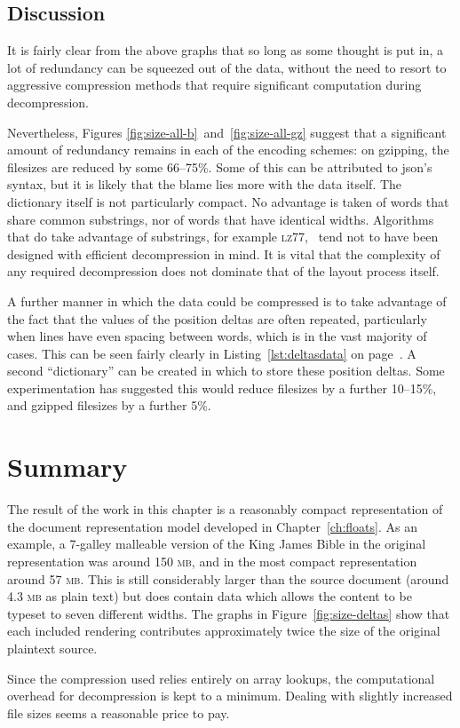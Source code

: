 \subsection{Discussion}

It is fairly clear from the above graphs that so long as some thought is put in, a lot of redundancy can be squeezed out of the data, without the need to resort to aggressive compression methods that require significant computation during decompression.

Nevertheless, Figures \ref{fig:size-all-b}~and~\ref{fig:size-all-gz} suggest that a significant amount of redundancy remains in each of the encoding schemes: on gzipping, the filesizes are reduced by some 66--75\%. Some of this can be attributed to \gls{json}'s syntax, but it is likely that the blame lies more with the data itself. The dictionary itself is not particularly compact. No advantage is taken of words that share common substrings, nor of words that have identical widths.
Algorithms that do take advantage of substrings, for example \textsc{lz77},~\cite{Ziv1977} tend not to have been designed with efficient decompression in mind. It is vital that the complexity of any required decompression does not dominate that of the layout process itself.

A further manner in which the data could be compressed is to take advantage of the fact that the values of the position deltas are often repeated, particularly when lines have even spacing between words, which is in the vast majority of cases. This can be seen fairly clearly in Listing~\ref{lst:deltasdata} on page~\pageref{lst:deltasdata}. A second ``dictionary'' can be created in which to store these position deltas. Some experimentation has suggested this would reduce filesizes by a further 10--15\%, and gzipped filesizes by a further 5\%.

\section{Summary}

The result of the work in this chapter is a reasonably compact representation of the document representation model developed in Chapter~\ref{ch:floats}. As an example, a 7-galley malleable version of the King James Bible in the original representation was around 150 \textsc{mb}, and in the most compact representation around 57 \textsc{mb}. This is still considerably larger than the source document (around 4.3 \textsc{mb} as plain text) but does contain data which allows the content to be typeset to seven different widths. The graphs in Figure~\ref{fig:size-deltas} show that each included rendering contributes approximately twice the size of the original plaintext source.

Since the compression used relies entirely on array lookups, the computational overhead for decompression is kept to a minimum. Dealing with slightly increased file sizes seems a reasonable price to pay.
